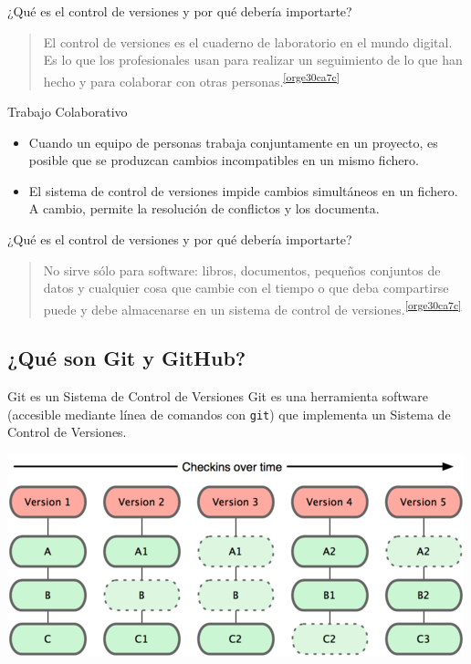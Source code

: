 \documentclass[xcolor={usenames,svgnames,dvipsnames}]{beamer}
\begin{document}
\begin{frame}[label={sec:org59381cf}]{¿Qué es el control de versiones y por qué debería importarte?}
\begin{quote}
El control de versiones es el \alert{cuaderno de laboratorio} en el mundo digital. Es lo que los profesionales usan para realizar un
\alert{seguimiento} de lo que han hecho y para \alert{colaborar} con otras
personas.\textsuperscript{\ref{orge30ca7c}}
\end{quote}

\begin{block}{Trabajo Colaborativo}
\begin{itemize}
\item Cuando un equipo de personas trabaja conjuntamente en un proyecto, es posible que se produzcan cambios incompatibles en un mismo fichero.
\item El sistema de control de versiones \alert{impide} cambios simultáneos en un fichero. A cambio, permite la \alert{resolución de conflictos} y los documenta.
\end{itemize}
\end{block}
\end{frame}

\begin{frame}[label={sec:orgdb0d6ff}]{¿Qué es el control de versiones y por qué debería importarte?}
\begin{quote}
\alert{No sirve sólo para software}: libros, documentos, pequeños conjuntos
de datos y cualquier cosa que cambie con el tiempo o que deba
compartirse puede y debe almacenarse en un sistema de control de
versiones.\textsuperscript{\ref{orge30ca7c}}
\end{quote}
\end{frame}

\subsection{¿Qué son Git y GitHub?}
\label{sec:org6dd5e46}

\begin{frame}[label={sec:orgf661adf},fragile]{Git es un Sistema de Control de Versiones}
 Git es una herramienta software (accesible mediante línea de comandos con \texttt{git}) que implementa un Sistema de Control de Versiones.

\begin{center}
\includegraphics[width=.9\linewidth]{figs/git_model.png}
\end{center}
\end{frame}
\end{document}
